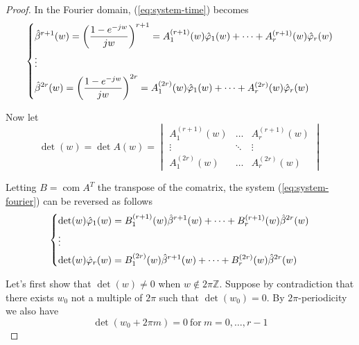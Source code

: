 \documentclass[a4paper, 11pt]{article}
\DeclareMathOperator*{\com}{com}
\begin{document}
\begin{proof}
  In the Fourier domain, (\ref{eq:system-time}) becomes
  \begin{equation}\label{eq:system-fourier}
    \begin{dcases}
      \hat{\beta}^{r+1}(w) = {\left(\frac{1-e^{-jw}}{jw}\right)}^{r+1} = A_1^{(r+1)}(w) \hat{\varphi}_1(w) + \cdots  + 
      A^{(r+1)}_r(w) \hat{\varphi}_r(w) \\
      \vdots \\
      \hat{\beta}^{2r}(w) =  {\left(\frac{1-e^{-jw}}{jw}\right)}^{2r}= A_1^{(2r)}(w) \hat{\varphi}_1(w) + \cdots  + 
      A^{(2r)}_r(w) \hat{\varphi}_r(w) \\
    \end{dcases}
  \end{equation}

  Now let \begin{equation}
    \det(w) = \det A(w) = \begin{vmatrix}
      A_1^{(r+1)}(w) & \hdots & A_r^{(r+1)}(w) \\
      \vdots & \ddots & \vdots \\
      A_1^{(2r)}(w) & \hdots & A_r^{(2r)}(w)
    \end{vmatrix}
  \end{equation}

  Letting $B = {\com A}^T$ the transpose of the comatrix, the system (\ref{eq:system-fourier}) can be reversed as 
  follows
  \begin{equation}\label{eq:system-reversed-fourier}
    \begin{dcases}
      \det(w)\hat{\varphi}_1(w) = B_1^{(r+1)}(w) \hat{\beta}^{r+1}(w) + \cdots  + B_r^{(r+1)}(w) \hat{\beta}^{2r}(w) \\
      \vdots \\
      \det(w)\hat{\varphi}_{r}(w) = B_1^{(2r)}(w) \hat{\beta}^{r+1}(w) + \cdots  + B_r^{(2r)}(w) \hat{\beta}^{2r}(w) \\
    \end{dcases}
  \end{equation}

  Let's first show that $\det(w) \neq 0$ when $w \not\in 2\pi \mathbb{Z}$. Suppose by contradiction that there exists 
  $w_0$ not a multiple of $2\pi$ such that $\det (w_0) = 0$. By $2\pi$-periodicity we also have
  \begin{equation*}
    \det(w_0 + 2\pi m) = 0 \ \text{for} \ m=0, \ldots, r-1
  \end{equation*}


\end{proof}
\end{document}
